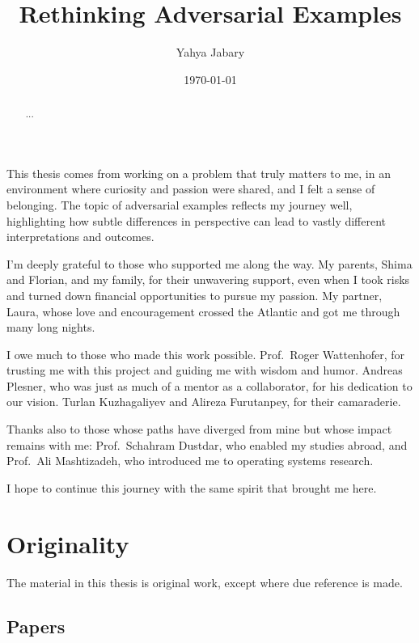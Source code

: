 \documentclass[a4paper, oneside]{discothesis}
\title{Rethinking Adversarial Examples}
\author{Yahya Jabary}
\institute{Computer Engineering and Networks Laboratory \\[2pt] ETH Zürich}
\date{\today}
\begin{document}
\frontmatter
\maketitle

\cleardoublepage

\begin{acknowledgements}
	This thesis comes from working on a problem that truly matters to me, in an environment where curiosity and passion were shared, and I felt a sense of belonging. The topic of adversarial examples reflects my journey well, highlighting how subtle differences in perspective can lead to vastly different interpretations and outcomes.

	I'm deeply grateful to those who supported me along the way. My parents, Shima and Florian, and my family, for their unwavering support, even when I took risks and turned down financial opportunities to pursue my passion. My partner, Laura, whose love and encouragement crossed the Atlantic and got me through many long nights.
	
	I owe much to those who made this work possible. Prof.\ Roger Wattenhofer, for trusting me with this project and guiding me with wisdom and humor. Andreas Plesner, who was just as much of a mentor as a collaborator, for his dedication to our vision. Turlan Kuzhagaliyev and Alireza Furutanpey, for their camaraderie.
	
	Thanks also to those whose paths have diverged from mine but whose impact remains with me: Prof.\ Schahram Dustdar, who enabled my studies abroad, and Prof.\ Ali Mashtizadeh, who introduced me to operating systems research.
	
	I hope to continue this journey with the same spirit that brought me here.
\end{acknowledgements}

\begin{abstract}
	...
\end{abstract}

\chapter*{Originality}

The material in this thesis is original work, except where due reference is made.

\section*{Papers}
\end{document}
